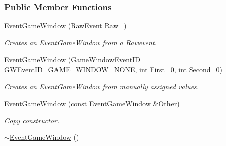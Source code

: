 \subsubsection*{Public Member Functions}
\begin{DoxyCompactItemize}
\item 
\hyperlink{classMezzanine_1_1EventGameWindow_a1ba3b047ac8203c5b1d33644f365039b}{EventGameWindow} (\hyperlink{namespaceMezzanine_ae8d4c0ab783af89a250b0225b75753e5}{RawEvent} Raw\_\-)
\begin{DoxyCompactList}\small\item\em Creates an \hyperlink{classMezzanine_1_1EventGameWindow}{EventGameWindow} from a Rawevent. \item\end{DoxyCompactList}\item 
\hyperlink{classMezzanine_1_1EventGameWindow_a9a7ca5ec6fe5f95244e6133b6627d4ac}{EventGameWindow} (\hyperlink{classMezzanine_1_1EventGameWindow_a0f0ff29853317334f018bcf48d502af2}{GameWindowEventID} GWEventID=GAME\_\-WINDOW\_\-NONE, int First=0, int Second=0)
\begin{DoxyCompactList}\small\item\em Creates an \hyperlink{classMezzanine_1_1EventGameWindow}{EventGameWindow} from manually assigned values. \item\end{DoxyCompactList}\item 
\hyperlink{classMezzanine_1_1EventGameWindow_aec071261cc581c6b6767f77691e20996}{EventGameWindow} (const \hyperlink{classMezzanine_1_1EventGameWindow}{EventGameWindow} \&Other)
\begin{DoxyCompactList}\small\item\em Copy constructor. \item\end{DoxyCompactList}\item 
\hypertarget{classMezzanine_1_1EventGameWindow_a68195b843c1126e30846e791c7ef3d99}{
\hyperlink{classMezzanine_1_1EventGameWindow_a68195b843c1126e30846e791c7ef3d99}{$\sim$EventGameWindow} ()}
\label{classMezzanine_1_1EventGameWindow_a68195b843c1126e30846e791c7ef3d99}


\end{DoxyCompactItemize}
